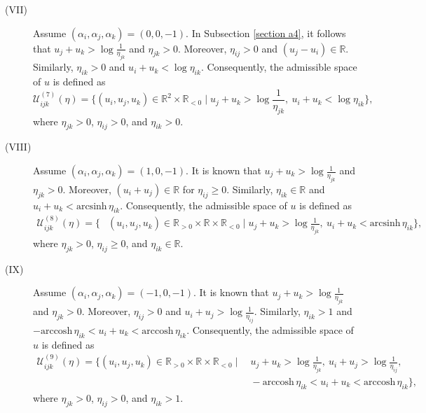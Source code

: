 \documentclass[12pt]{amsart}
\theoremstyle{definition}
\begin{document}
\begin{description}
\item[(VII)]
Assume $(\alpha_i,\alpha_j,\alpha_k)=(0,0,-1)$.
In Subsection \ref{section a4}, it follows that $u_j+u_k>\log \frac{1}{\eta_{jk}}$ and $\eta_{jk}>0$.
Moreover, $\eta_{ij}>0$ and $(u_j-u_i)\in \mathbb{R}$. 
Similarly, $\eta_{ik}>0$ and $u_i+u_k<\log \eta_{ik}$.
Consequently, the admissible space of $u$ is defined as
\begin{equation*}
\mathcal{U}^{(7)}_{ijk}(\eta)
=\{(u_i,u_j,u_k)\in \mathbb{R}^2\times\mathbb{R}_{<0}
\mid u_j+u_k>\log \frac{1}{\eta_{jk}},\ u_i+u_k<\log \eta_{ik}\},
\end{equation*}
where $\eta_{jk}>0$, $\eta_{ij}>0$, and $\eta_{ik}>0$.

\item[(VIII)]
Assume $(\alpha_i,\alpha_j,\alpha_k)=(1,0,-1)$.
It is known that $u_j+u_k>\log \frac{1}{\eta_{jk}}$ and $\eta_{jk}>0$.
Moreover, $(u_i+u_j)\in \mathbb{R}$ for $\eta_{ij}\geq0$.
Similarly, $\eta_{ik}\in \mathbb{R}$ and $u_i+u_k<\mathrm{arcsinh}\, \eta_{ik}$.
Consequently, the admissible space of $u$ is defined as
\begin{equation*}
\begin{aligned}
\mathcal{U}^{(8)}_{ijk}(\eta)
=\{&(u_i,u_j,u_k)\in \mathbb{R}_{>0}\times\mathbb{R}\times\mathbb{R}_{<0}
\mid u_j+u_k>\log \frac{1}{\eta_{jk}},\ u_i+u_k<\mathrm{arcsinh}\, \eta_{ik} \},
\end{aligned}
\end{equation*}
where $\eta_{jk}>0$, $\eta_{ij}\geq0$, and $\eta_{ik}\in \mathbb{R}$.

\item[(IX)]
Assume $(\alpha_i,\alpha_j,\alpha_k)=(-1,0,-1)$.
It is known that $u_j+u_k>\log \frac{1}{\eta_{jk}}$ and $\eta_{jk}>0$.
Moreover, $\eta_{ij}>0$ and $u_i+u_j>\log\frac{1}{\eta_{ij}}$. 
Similarly, $\eta_{ik}>1$ and $-\mathrm{arccosh}\, \eta_{ik}<u_i+u_k<\mathrm{arccosh}\, \eta_{ik}$.
Consequently, the admissible space of $u$ is defined as
\begin{equation*}
\begin{aligned}
\mathcal{U}^{(9)}_{ijk}(\eta)
=\{(u_i,u_j,u_k)\in \mathbb{R}_{>0}\times\mathbb{R}\times\mathbb{R}_{<0}
\mid &\ u_j+u_k>\log \frac{1}{\eta_{jk}},\ u_i+u_j>\log\frac{1}{\eta_{ij}},\ \\
&\ -\mathrm{arccosh}\, \eta_{ik}<u_i+u_k<\mathrm{arccosh}\, \eta_{ik} \},
\end{aligned}
\end{equation*}
where $\eta_{jk}>0$, $\eta_{ij}>0$, and $\eta_{ik}>1$.


\end{description}
\end{document}
